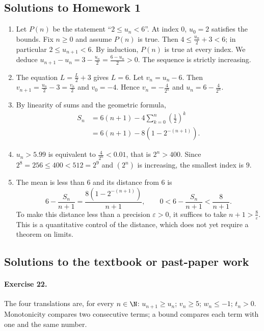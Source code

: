 \subsection{Solutions to Homework 1}\begin{enumerate}
\item Let $P(n)$ be the statement ``$2\le u_n<6$''. At index $0$, $u_0=2$ satisfies the bounds. Fix $n\ge0$ and assume $P(n)$ is true. Then $4\le \frac{u_n}{2}+3<6$; in particular $2\le u_{n+1}<6$. By induction, $P(n)$ is true at every index. We deduce $u_{n+1}-u_n=3-\frac{u_n}{2}=\frac{6-u_n}{2}>0$. The sequence is strictly increasing.
\item The equation $L=\frac{L}{2}+3$ gives $L=6$. Let $v_n=u_n-6$. Then $v_{n+1}=\frac{u_n}{2}-3=\frac{v_n}{2}$ and $v_0=-4$. Hence $v_n=-\frac{4}{2^n}$ and $u_n=6-\frac{4}{2^n}$.
\item By linearity of sums and the geometric formula,
\[\begin{aligned}S_n&=6(n+1)-4\sum_{k=0}^n(\frac{1}{2})^k\\&=6(n+1)-8(1-2^{-(n+1)}).\end{aligned}\]
\item $u_n>\num{5,99}$ is equivalent to $\frac{4}{2^n}<\num{0,01}$, that is $2^n>400$. Since $2^8=256\le400<512=2^9$ and $(2^n)$ is increasing, the smallest index is $9$.
\item The mean is less than $6$ and its distance from $6$ is
\[6-\frac{S_n}{n+1}=\frac{8(1-2^{-(n+1)})}{n+1},\qquad 0<6-\frac{S_n}{n+1}<\frac8{n+1}.\]
To make this distance less than a precision $\varepsilon>0$, it suffices to take $n+1>\frac{8}{\varepsilon}$. This is a quantitative control of the distance, which does not yet require a theorem on limits.
\end{enumerate}

\subsection{Solutions to the textbook or past-paper work}\paragraph{Exercise 22.} The four translations are, for every $n\in\N$: $u_{n+1}\ge u_n$; $v_n\ge5$; $w_n\le-1$; $t_n>0$. Monotonicity compares two consecutive terms; a bound compares each term with one and the same number.
